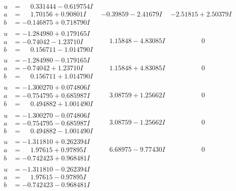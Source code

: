 \documentclass[1p]{elsarticle_modified}
\theoremstyle{definition}
\begin{document}
$$\begin{array}{c|c|c}
\begin{aligned}
u &= \phantom{-}0.331444 - 0.619754 I \\
a &= \phantom{-}1.70156 + 0.90801 I \\
b &= -0.146875 + 0.718790 I\end{aligned}
 & -0.39859 - 2.41679 I & -2.51815 + 2.50379 I \\ \hline\begin{aligned}
u &= -1.284980 + 0.179165 I \\
a &= -0.74042 - 1.23710 I \\
b &= \phantom{-}0.156711 - 1.014790 I\end{aligned}
 & \phantom{-}1.15848 - 4.83085 I & \phantom{-0.000000 } 0 \\ \hline\begin{aligned}
u &= -1.284980 - 0.179165 I \\
a &= -0.74042 + 1.23710 I \\
b &= \phantom{-}0.156711 + 1.014790 I\end{aligned}
 & \phantom{-}1.15848 + 4.83085 I & \phantom{-0.000000 } 0 \\ \hline\begin{aligned}
u &= -1.300270 + 0.074806 I \\
a &= -0.754795 + 0.685987 I \\
b &= \phantom{-}0.494882 + 1.001490 I\end{aligned}
 & \phantom{-}3.08759 + 1.25662 I & \phantom{-0.000000 } 0 \\ \hline\begin{aligned}
u &= -1.300270 - 0.074806 I \\
a &= -0.754795 - 0.685987 I \\
b &= \phantom{-}0.494882 - 1.001490 I\end{aligned}
 & \phantom{-}3.08759 - 1.25662 I & \phantom{-0.000000 } 0 \\ \hline\begin{aligned}
u &= -1.311810 + 0.262394 I \\
a &= \phantom{-}1.97615 + 0.97895 I \\
b &= -0.742423 + 0.968481 I\end{aligned}
 & \phantom{-}6.68975 - 9.77430 I & \phantom{-0.000000 } 0 \\ \hline\begin{aligned}
u &= -1.311810 - 0.262394 I \\
a &= \phantom{-}1.97615 - 0.97895 I \\
b &= -0.742423 - 0.968481 I\end{aligned}

\end{array}$$
\end{document}

